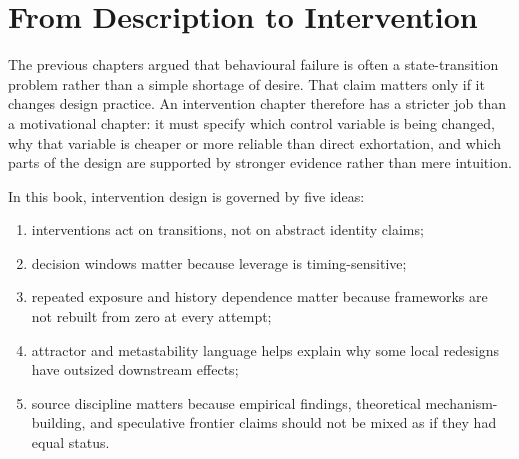 \section{From Description to Intervention}

The previous chapters argued that behavioural failure is often a state-transition
problem rather than a simple shortage of desire. That claim matters only if it
changes design practice. An intervention chapter therefore has a stricter job
than a motivational chapter: it must specify which control variable is being
changed, why that variable is cheaper or more reliable than direct exhortation,
and which parts of the design are supported by stronger evidence rather than
mere intuition.

In this book, intervention design is governed by five ideas:
\begin{enumerate}[nosep]
  \item interventions act on transitions, not on abstract identity claims;
  \item decision windows matter because leverage is timing-sensitive;
  \item repeated exposure and history dependence matter because frameworks are
        not rebuilt from zero at every attempt;
  \item attractor and metastability language helps explain why some local
        redesigns have outsized downstream effects;
  \item source discipline matters because empirical findings, theoretical
        mechanism-building, and speculative frontier claims should not be mixed
        as if they had equal status.
\end{enumerate}
